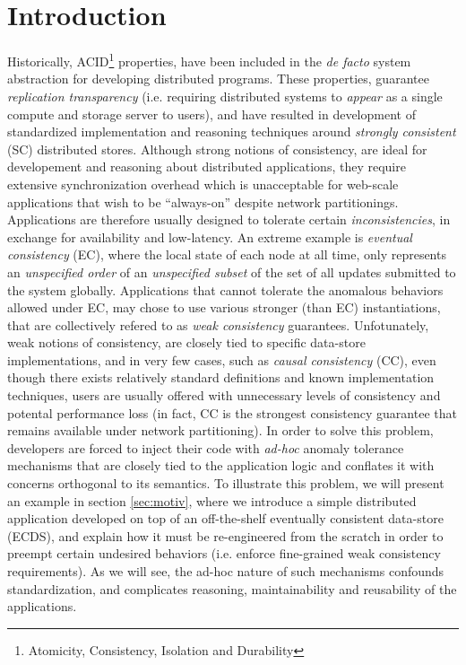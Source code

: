 \section{Introduction}
\label{sec:intro}
Historically, ACID\footnote{Atomicity, Consistency, Isolation and
Durability} properties, have been included in the \emph{de facto} system
abstraction for developing distributed programs. 
These properties, guarantee \emph{replication transparency}  (i.e. requiring distributed
systems to \emph{appear} as a single compute and storage server to
users), and have resulted in development of standardized implementation and
reasoning techniques around \emph{strongly consistent} (SC) distributed
stores.
Although strong notions of consistency, are ideal for developement and
reasoning about distributed applications, 
they require extensive synchronization overhead which is unacceptable
for web-scale applications that wish to be ``always-on'' despite network
partitionings. Applications are therefore usually designed to tolerate
certain \emph{inconsistencies}, in exchange for availability and
low-latency. 
An extreme example is \emph{eventual consistency} (EC), where
the local state of each node at all time,
only represents an \emph{unspecified order} of an \emph{unspecified
subset} of the set of all updates submitted to the system globally.
Applications that  cannot tolerate the anomalous behaviors allowed under
EC, may chose to use various stronger (than EC) instantiations, that are
collectively refered to as \emph{weak consistency} guarantees. 
Unfotunately, weak notions of consistency, are closely tied to 
specific data-store implementations, and in very few cases, such as 
\emph{causal consistency} (CC), even though there exists
relatively standard definitions and known implementation techniques,
users are usually offered with unnecessary levels of consistency and potental
performance loss (in fact, CC is the
strongest consistency guarantee that remains available under network
partitioning). In order to solve this problem, developers are forced to
inject their code with \emph{ad-hoc} anomaly tolerance mechanisms that are closely
tied to the application logic and conflates it with concerns orthogonal
to its semantics.
To illustrate this problem, we will present an example in section
\ref{sec:motiv}, where we introduce a simple distributed application
developed on top of an off-the-shelf eventually consistent data-store
(ECDS), and explain how it must be re-engineered from the scratch in
order to preempt certain undesired behaviors (i.e. enforce fine-grained
weak consistency requirements). As we will see, the ad-hoc
nature of such mechanisms confounds standardization, and complicates
reasoning, maintainability and reusability of the applications.

